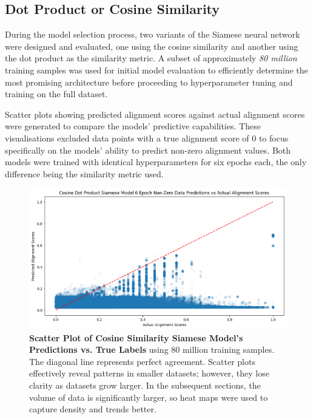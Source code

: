 \subsection{Dot Product or Cosine Similarity}
During the model selection process, two variants of the Siamese neural network were designed and evaluated, one using the cosine similarity and another using the dot product as the similarity metric. A subset of approximately \textit{80 million} training samples was used for initial model evaluation to efficiently determine the most promising architecture before proceeding to hyperparameter tuning and training on the full dataset.

Scatter plots showing predicted alignment scores against actual alignment scores were generated to compare the models' predictive capabilities. These visualisations excluded data points with a true alignment score of 0 to focus specifically on the models' ability to predict non-zero alignment values. Both models were trained with identical hyperparameters for six epochs each, the only difference being the similarity metric used.

\begin{figure}[tbh!]
\centering
\includegraphics[scale=0.4]{Figures/ModelArchitecture/Cosine6Epoch.png}
\caption{\textbf{Scatter Plot of Cosine Similarity Siamese Model's Predictions vs. True Labels} using 80 million training samples. The diagonal line represents perfect agreement. Scatter plots effectively reveal patterns in smaller datasets; however, they lose clarity as datasets grow larger. In the subsequent sections, the volume of data is significantly larger, so heat maps were used to capture density and trends better.} 
\label{fig:CosineSiameseModel}
\end{figure}

